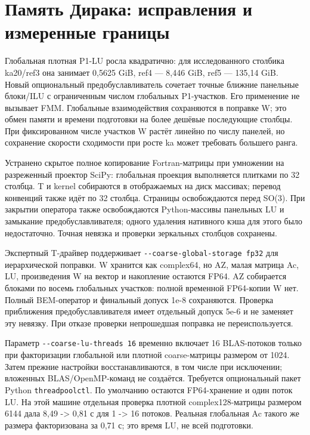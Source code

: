 \documentclass[
  russian,
  11pt,
  a4paper,
]{report}
\begin{document}
\section{Память Дирака: исправления и измеренные
границы}\label{ux43fux430ux43cux44fux442ux44c-ux434ux438ux440ux430ux43aux430-ux438ux441ux43fux440ux430ux432ux43bux435ux43dux438ux44f-ux438-ux438ux437ux43cux435ux440ux435ux43dux43dux44bux435-ux433ux440ux430ux43dux438ux446ux44b}

Глобальная плотная P1-LU росла квадратично: для исследованного столбика
ka20/ref3 она занимает 0,5625 GiB, ref4 --- 8,446 GiB, ref5 --- 135,14
GiB. Новый опциональный предобуславливатель сочетает точные ближние
панельные блоки/ILU с ограниченным числом глобальных P1-участков. Его
применение не вызывает FMM. Глобальные взаимодействия сохраняются в
поправке W; это обмен памяти и времени подготовки на более дешёвые
последующие столбцы. При фиксированном числе участков W растёт линейно
по числу панелей, но сохранение скорости сходимости при росте ka может
требовать большего ранга.

Устранено скрытое полное копирование Fortran-матрицы при умножении на
разреженный проектор SciPy: глобальная проекция выполняется плитками по
32 столбца. T и kernel собираются в отображаемых на диск массивах;
перевод конвенций также идёт по 32 столбца. Страницы освобождаются перед
SO(3). При закрытии оператора также освобождаются Python-массивы
панельных LU и замыкание предобуславливателя; одного удаления нативного
кэша для этого было недостаточно. Точная невязка и проверки зеркальных
столбцов сохранены.

Экспертный T-драйвер поддерживает
\nolinkurl{--coarse-global-storage fp32} для иерархической поправки. W
хранится как complex64, но AZ, малая матрица Ac, LU, произведения W на
вектор и накопление остаются FP64. AZ собирается блоками по восемь
глобальных участков: полной временной FP64-копии W нет. Полный
BEM-оператор и финальный допуск 1e-8 сохраняются. Проверка приближения
предобуславливателя имеет отдельный допуск 5e-6 и не заменяет эту
невязку. При отказе проверки непрошедшая поправка не переиспользуется.

Параметр \nolinkurl{--coarse-lu-threads 16} временно включает 16
BLAS-потоков только при факторизации глобальной или плотной
coarse-матрицы размером от 1024. Затем прежние настройки
восстанавливаются, в том числе при исключении; вложенных
BLAS/OpenMP-команд не создаётся. Требуется опциональный пакет Python
\nolinkurl{threadpoolctl}. По умолчанию остаются FP64-хранение и один
поток LU. На этой машине отдельная проверка плотной complex128-матрицы
размером 6144 дала 8,49 -\textgreater{} 0,81 с для 1 -\textgreater{} 16
потоков. Реальная глобальная Ac такого же размера факторизована за 0,71
с; это время LU, не всей подготовки.
\end{document}
